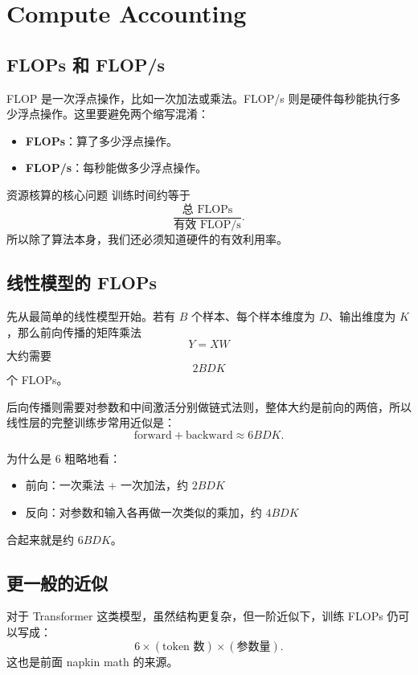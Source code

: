 \section{Compute Accounting}

\subsection{FLOPs 和 FLOP/s}

FLOP 是一次浮点操作，比如一次加法或乘法。FLOP/s 则是硬件每秒能执行多少浮点操作。这里要避免两个缩写混淆：

\begin{itemize}
    \item \textbf{FLOPs}：算了多少浮点操作。
    \item \textbf{FLOP/s}：每秒能做多少浮点操作。
\end{itemize}

\begin{importantbox}{资源核算的核心问题}
训练时间约等于
\[
\frac{\text{总 FLOPs}}{\text{有效 FLOP/s}}.
\]
所以除了算法本身，我们还必须知道硬件的有效利用率。
\end{importantbox}

\subsection{线性模型的 FLOPs}

先从最简单的线性模型开始。若有 \(B\) 个样本、每个样本维度为 \(D\)、输出维度为 \(K\)，那么前向传播的矩阵乘法
\[
Y = XW
\]
大约需要
\[
2BDK
\]
个 FLOPs。

后向传播则需要对参数和中间激活分别做链式法则，整体大约是前向的两倍，所以线性层的完整训练步常用近似是：
\[
\text{forward} + \text{backward} \approx 6BDK.
\]

\begin{knowledgebox}{为什么是 6}
粗略地看：
\begin{itemize}
    \item 前向：一次乘法 + 一次加法，约 \(2BDK\)
    \item 反向：对参数和输入各再做一次类似的乘加，约 \(4BDK\)
\end{itemize}
合起来就是约 \(6BDK\)。
\end{knowledgebox}

\subsection{更一般的近似}

对于 Transformer 这类模型，虽然结构更复杂，但一阶近似下，训练 FLOPs 仍可以写成：
\[
6 \times (\text{token 数}) \times (\text{参数量}).
\]
这也是前面 napkin math 的来源。


